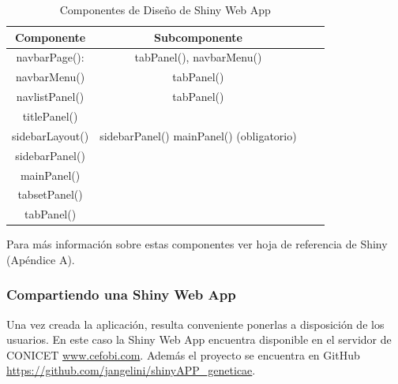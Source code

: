 {\small
\begin{table}[h]
\begin{center}
\caption{Componentes de Diseño de Shiny Web App}
\label{tab:tabla2}
\resizebox{0.6\textwidth}{!} {
\begin{tabular}{cccc}
\hline 
Componente	& Subcomponente	 \\
\hline
navbarPage(): & tabPanel(), navbarMenu()\\
navbarMenu() & tabPanel() \\
navlistPanel() & tabPanel()\\
titlePanel() &	\\
sidebarLayout() & sidebarPanel()  mainPanel() (obligatorio)	\\
sidebarPanel() & \\
mainPanel() & \\
tabsetPanel() &	\\
tabPanel()	 & \\
\hline
\end{tabular}
}
\end{center}
\end{table}
}


Para más información sobre estas componentes ver hoja de referencia de Shiny (Apéndice A).


\subsubsection{Compartiendo una Shiny Web App}

Una vez creada la aplicación, resulta conveniente ponerlas a disposición de los usuarios. En este caso la Shiny Web App encuentra disponible en el servidor de CONICET \url{www.cefobi.com}. Además el proyecto se encuentra en GitHub \url{https://github.com/jangelini/shinyAPP_geneticae}. 
